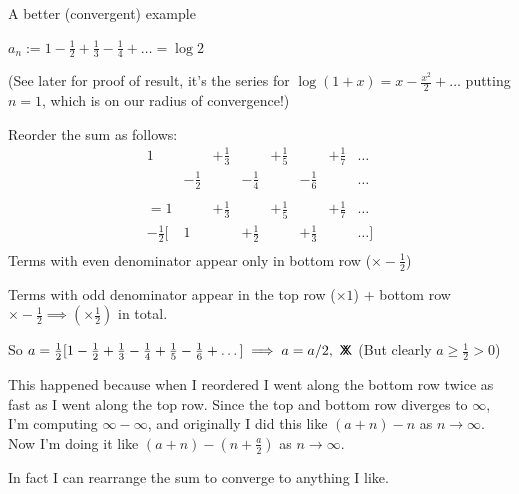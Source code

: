 \documentclass[10pt,twoside]{scrartcl}
\newcommand*{\cont}{%
  \mathsf{X}\mkern-8.5mu\mathsf{X}%
}
\begin{document}
A better (convergent) example\\

\begin{example}
$a_n:= 1 - \frac{1}{2} + \frac{1}{3} - \frac{1}{4} + \dots 	= \log 2$

(See later for proof of result, it's the series for $\log(1+x) = x - \frac{x^2}{2} + \dots$ putting $n=1$, which is on our radius of convergence!)

Reorder the sum as follows:
\[\begin{array}{cccccccc}
	1 & ~ & +\frac{1}{3} & ~ & +\frac{1}{5} & ~ & +\frac{1}{7} & \dots \\
	& -\frac{1}{2} & ~ & -\frac{1}{4} & ~ & -\frac{1}{6} & ~ & \dots \\
	&&&&&&&\\
= 	1 & ~ & +\frac{1}{3} & ~ & +\frac{1}{5} & ~ & +\frac{1}{7} & \dots \\
	-\frac{1}{2} [& 1 & ~ & +\frac{1}{2} & ~ & +\frac{1}{3} & ~ & \dots ]\\

\end{array}\]
Terms with even denominator appear only in bottom row ($\times -\frac{1}{2}$)

Terms with odd denominator appear in the top row ($\times 1$) + bottom row $\times -\frac{1}{2} \implies (\times \frac{1}{2})$ in total. 

So $a = \frac{1}{2}[1-\frac{1}{2} + \frac{1}{3} - \frac{1}{4} + \frac{1}{5} -\frac{1}{6} + \dots] \implies a = a/2,~\cont$ (But clearly $a \geq \frac{1}{2} > 0$)

\end{example}

This happened because when I reordered I went along the bottom row twice as fast as I went along the top row. Since the top and bottom row diverges to $\infty$, I'm computing $\infty - \infty$, and originally I did this like $(a+n) - n$ as $n \to \infty$. Now I'm doing it like $(a + n) - (n + \frac{a}{2})$ as $n \to \infty$. 


In fact I can rearrange the sum to converge to anything I like.\\
\end{document}
